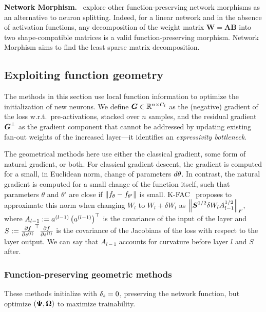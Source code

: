 \textbf{Network Morphism.}~\citet{wei_network_2016} explore other function-preserving network morphisms as an alternative to neuron splitting. Indeed, for a linear network and in the absence of activation functions, any decomposition of the weight matrix $\boldsymbol{W} = \boldsymbol{A}\boldsymbol{B}$ into two shape-compatible matrices is a valid function-preserving morphism. Network Morphism aims to find the least sparse matrix decomposition.

\subsection{Exploiting function geometry}
\label{sec:function_geometry}

The methods in this section use local function information to optimize the initialization of new neurons. We define $\Gradpreact \in \mathbb{R}^{n \times \cp}$ as the (negative) gradient of the loss w.r.t.\ pre-activations, stacked over $n$ samples, and the residual gradient $\Bottleneck$ as the gradient component that cannot be addressed by updating existing fan-out weights of the increased layer---it identifies an \emph{expressivity bottleneck}.

The geometrical methods here use either the classical gradient, some form of natural gradient, or both. For classical gradient descent, the gradient is computed for a small, in Euclidean norm, change of parameters $\dtheta$. In contrast, the natural gradient is computed for a small change of the function itself, such that parameters $\theta$ and $\theta'$ are close if $\norm{f_{\theta} - f_{\theta'}}$ is small.
K-FAC~\citep{dangelKroneckerfactoredApproximateCurvature2025} proposes to approximate this norm when changing $W_l$ to $W_l+\delta W_l$ as $\frob{\sqrtS \delta W_l \sqrtA_{l-1}}$,
where $A_{l-1} := \postact[l-1] \transp{\postact[l-1]}$ is the covariance of the input of the layer
and $S:= \trans{\frac{\partial f}{\partial \preact[l]}} \frac{\partial f}{\partial \preact[l]}$ is the covariance of the Jacobians of the loss with respect to the layer output.
We can say that $A_{l-1}$ accounts for curvature before layer $l$ and $S$ after.

\subsubsection{Function-preserving geometric methods}

These methods initialize with $\deltas = 0$, preserving the network function, but optimize $(\Fanin, \Fanout)$ to maximize trainability.

